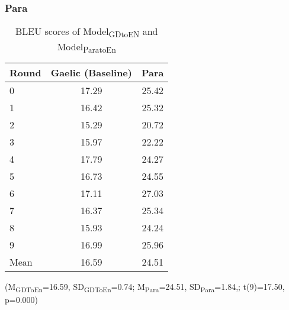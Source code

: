 \documentclass[a4paper]{article}
\begin{document}
\subsubsection{Para}\label{treatment:Para}
\begin{table}[ht]
\centering
\begin{tabular}{lcc}
  \hline
Round & Gaelic (Baseline) & Para \\ 
  \hline
0 & 17.29 & 25.42 \\ 
  1 & 16.42 & 25.32 \\ 
  2 & 15.29 & 20.72 \\ 
  3 & 15.97 & 22.22 \\ 
  4 & 17.79 & 24.27 \\ 
  5 & 16.73 & 24.55 \\ 
  6 & 17.11 & 27.03 \\ 
  7 & 16.37 & 25.34 \\ 
  8 & 15.93 & 24.24 \\ 
  9 & 16.99 & 25.96 \\ 
   \hline
Mean & 16.59 & 24.51 \\ 
   \hline
\end{tabular}
\caption{BLEU scores of Model\textsubscript{GDtoEN} and Model\textsubscript{ParatoEn}} 
\label{Table:Para}
\end{table}(M\textsubscript{GDToEn}=16.59, SD\textsubscript{GDToEn}=0.74; M\textsubscript{Para}=24.51, SD\textsubscript{Para}=1.84,; t(9)=17.50, p=0.000)
\end{document}
